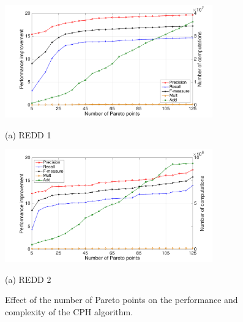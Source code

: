\begin{figure}[htb]
\begin{minipage}[b]{1\linewidth}
  \centering
  \centerline{\includegraphics[width=0.8\textwidth]{./chapters/chapter5/images/R1_cph_L.pdf}}
  \centerline{(a) REDD 1}\medskip
\end{minipage}
\hfill
\begin{minipage}[b]{1\linewidth}
  \centering
  \centerline{\includegraphics[width=0.8\textwidth]{./chapters/chapter5/images/R2_cph_L.pdf}}
  \centerline{(a) REDD 2}\medskip
\end{minipage}
\caption{Effect of the number of Pareto points on the performance and complexity of the CPH algorithm.}
\label{fig:SR9}
%
\end{figure}

